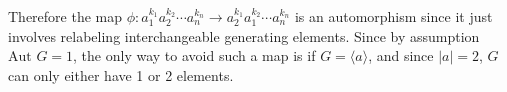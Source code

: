 \documentclass[letterpaper, reqno,11pt]{article}
\begin{document}
Therefore the map $\phi: a_1^{k_1}a_2^{k_2}\cdots a_n^{k_n}\to a_2^{k_1}a_1^{k_2}\cdots a_n^{k_n}$ is an automorphism since it just involves relabeling interchangeable generating elements. Since by assumption $\text{Aut }G=1$, the only way to avoid such a map is if $G=\langle a\rangle$, and since $|a|=2$, $G$ can only either have 1 or 2 elements.
\end{document}
